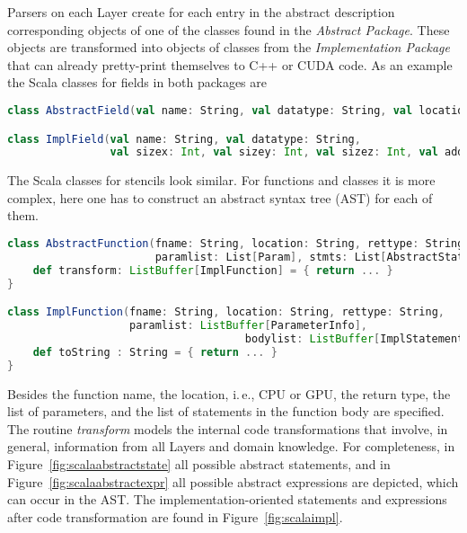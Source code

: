 \documentclass[onecolumn]{svjour3}
\begin{document}
Parsers on each Layer create for each entry in the abstract description corresponding objects of one of the classes found in the \textit{Abstract Package}. These objects are transformed into objects of classes from the \textit{Implementation Package} that can already pretty-print themselves to C++ or CUDA code.  
As an example the Scala classes for fields in both packages are

\begin{minipage}{\textwidth}
\begin{lstlisting}[language=Scala]
class AbstractField(val name: String, val datatype: String, val location: String)

class ImplField(val name: String, val datatype: String, 
                val sizex: Int, val sizey: Int, val sizez: Int, val addpoints: Int)
\end{lstlisting}
\end{minipage}

The Scala classes for stencils look similar. For functions and classes it is more complex, here one has to construct an abstract syntax tree (AST) for each of them. 

\begin{minipage}{\textwidth}
\begin{lstlisting}[language=Scala]
class AbstractFunction(fname: String, location: String, rettype: String, 
                       paramlist: List[Param], stmts: List[AbstractStatement]) {
    def transform: ListBuffer[ImplFunction] = { return ... }
}

class ImplFunction(fname: String, location: String, rettype: String, 
                   paramlist: ListBuffer[ParameterInfo], 
									 bodylist: ListBuffer[ImplStatement]) {
    def toString : String = { return ... }							
}
\end{lstlisting}
\end{minipage}

Besides the function name, the location, i.\,e., CPU or GPU, the return type, the list of parameters, and the list of statements in the function body are specified. The routine \textit{transform} models the internal code transformations that involve, in general, information from all Layers and domain knowledge. For completeness, in Figure~\ref{fig:scalaabstractstate} all possible abstract statements, and in Figure~\ref{fig:scalaabstractexpr} all possible abstract expressions are depicted, which can occur in the AST. The implementation-oriented statements and expressions after code transformation are found in Figure~\ref{fig:scalaimpl}. 
\end{document}
